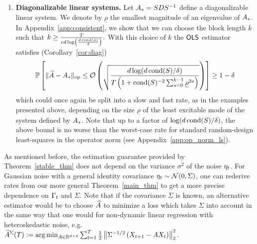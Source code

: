 \begin{enumerate}
	\item \textbf{Diagonalizable linear systems.} Let $A_{*} = SDS^{-1}$ define a diagonalizable linear system. We denote by $\underline{\rho}$ the smallest magnitude of an eigenvalue of $A_{*}$. In Appendix~\ref{app:consistent}, we show that we can choose the block length $k$ such that
$
k \geq \frac{T}{c d \log\left(\frac{d \, \mathrm{cond}(S)}{\delta}\right)}. 
$
With this choice of $k$ the $\mathsf{OLS }$ estimator satisfies (Corollary~\ref{cor:diag})
\begin{align*}
\mathbb{P}\left[\lVert \widehat{A} - A_{*} \rVert_{\mathrm{op}} \leq \operatorname{\mathcal{O}}\left(\sqrt{\frac{d\log(d \, \mathrm{cond}(S)/\delta)}{T\left(1 + \mathrm{cond}(S)^{-2}\sum_{s = 0}^{k-1}\underline{\rho}^{2s}\right)}}\right)\right] \ge 1- \delta
\end{align*}
which could once again be split into a slow and fast rate, as in the examples presented above, depending on the size $\underline{\rho}$ of the least excitable mode of the system defined by $A_{*}$. Note that up to a factor of $\log(d \, \mathrm{cond}(S)/\delta)$, the above bound is no worse than the worst-case rate for standard random-design least-squares in the operator norm (see Appendix~\ref{app:op_norm_ls}).
\end{enumerate}
\begin{remark} As mentioned before, the estimation guarantee provided by Theorem~\ref{stable_thm} does not depend on the variance $\sigma^2$ of the noise $\eta_t$. For Gaussian noise with a general identity covariance $\eta_t \sim \mathcal{N}(0,\Sigma)$, one can rederive rates from our more general Theorem~\ref{main_thm} to get a more precise dependence on $\Gamma_t$ and $\Sigma$.
%
Note that if the covariance $\Sigma$ is known, an alternative estimator would be to choose $\widehat{A}$ to minimize a loss which takes $\Sigma$ into account in the same way that one would for non-dynamic linear regression with heteroskedastic noise, e.g. $\widehat{A}^{\Sigma}(T) := \arg\min_{A \in \mathbb{R}^{d \times d}} \sum_{t=1}^T \frac{1}{2}\left\|\Sigma^{-1/2}\left(X_{t + 1} - A X_t\right)\right\|_2^2$.
\end{remark}
